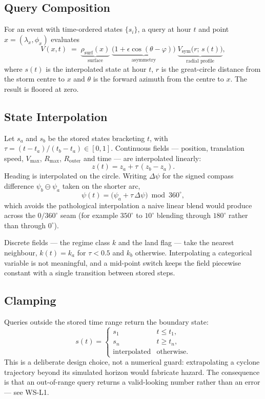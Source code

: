 \documentclass[11pt,a4paper]{article}
\begin{document}
\mkmframework

\subsection{Query Composition}
For an event with time-ordered states $\{s_i\}$, a query at hour $t$ and point
$x = (\lambda_x, \phi_x)$ evaluates
\[
  V(x, t) \;=\; \underbrace{\rho_{\text{surf}}(x)}_{\text{surface}}\;
                \underbrace{\bigl(1 + \epsilon \cos(\theta - \varphi)\bigr)}_{\text{asymmetry}}\;
                \underbrace{V_{\text{sym}}\bigl(r;\, s(t)\bigr)}_{\text{radial profile}},
\]
where $s(t)$ is the interpolated state at hour $t$, $r$ is the great-circle
distance from the storm centre to $x$ and $\theta$ is the forward azimuth from
the centre to $x$. The result is floored at zero.

\subsection{State Interpolation}
Let $s_a$ and $s_b$ be the stored states bracketing $t$, with
$\tau = (t - t_a)/(t_b - t_a) \in [0, 1]$. Continuous fields --- position,
translation speed, $V_{\max}$, $R_{\max}$, $R_{\text{outer}}$ and time --- are
interpolated linearly:
\[
  z(t) = z_a + \tau\,(z_b - z_a).
\]
Heading is interpolated on the circle. Writing $\Delta\psi$ for the signed
compass difference $\psi_b \ominus \psi_a$ taken on the shorter arc,
\[
  \psi(t) = \bigl(\psi_a + \tau\,\Delta\psi\bigr) \bmod 360^\circ,
\]
which avoids the pathological interpolation a naive linear blend would produce
across the $0/360^\circ$ seam (for example $350^\circ$ to $10^\circ$ blending
through $180^\circ$ rather than through $0^\circ$).

Discrete fields --- the regime class $k$ and the land flag --- take the nearest
neighbour, $k(t) = k_a$ for $\tau < 0.5$ and $k_b$ otherwise. Interpolating a
categorical variable is not meaningful, and a mid-point switch keeps the field
piecewise constant with a single transition between stored steps.

\subsection{Clamping}
Queries outside the stored time range return the boundary state:
\[
  s(t) = \begin{cases}
    s_1                & t \le t_1, \\
    s_n                & t \ge t_n, \\
    \text{interpolated}& \text{otherwise.}
  \end{cases}
\]
This is a deliberate design choice, not a numerical guard: extrapolating a
cyclone trajectory beyond its simulated horizon would fabricate hazard. The
consequence is that an out-of-range query returns a valid-looking number rather
than an error --- see WS-L1.
\end{document}
